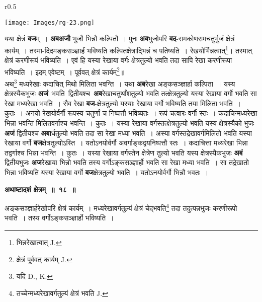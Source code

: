 \documentclass[11pt, openany]{book}
\begin{document}
\newpage

\begin{wrapfigure}{r}{0.5\textwidth}
\vspace{-4mm}
\begin{center}
\texttt{[image: Images/rg-23.png]}
\end{center}
\vspace{-8mm}
\end{wrapfigure}

यथा क्षेत्रं \textbf{बज}म्~। \textbf{अबअजौ} भुजौ भिन्नौ कल्पितौ~। पुनः \textbf{अब}भुजोपरि \textbf{बद}-समकोणसमचतुर्भुजं क्षेत्रं कार्यम्~। तस्मा-दिदमङ्कसञ्ज्ञार्हं भविष्यति कल्पितक्षेत्राद्भिन्नं च पतिष्यति~। रेखयोर्भिन्नत्वात्\renewcommand{\thefootnote}{१}\footnote{भिन्नरेखात्वात् J.}\;। तस्मात् क्षेत्रं करणीरूपं भविष्यति~। एवं हि यस्या रेखाया वर्गः क्षेत्रतुल्यो भवति तदा सापि रेखा करणीरूपा भविष्यति~। इदम् एवेष्टम्~। पूर्ववत् क्षेत्रं कार्यम्\renewcommand{\thefootnote}{२}\footnote{क्षेत्रं पूर्ववत् कार्यम् {\en J.}}\;॥ \\

 अथ\renewcommand{\thefootnote}{३}\footnote{यदि {\en D., K.}} मध्यरेखाः कदाचित् मिथो मिलिता भवन्ति~। यथा \textbf{अब}रेखा  अङ्कसञ्ज्ञार्हा कल्पिता~। यस्य \,क्षेत्रस्यैकभुजः \textbf{अजं} \,भवति \,द्वितीयश्च \,\textbf{अब}रेखाचतुर्थांशतुल्यो भवति तत्क्षेत्रतुल्यो यस्या रेखाया वर्गो भवति सा रेखा मध्यरेखा भवति~। सैव रेखा \textbf{बज}-क्षेत्रतुल्यो यस्याः रेखाया वर्गो भविष्यति तया मिलिता भवति~। कुतः~। अनयो रेखयोर्वर्गौ रूपस्य चतुर्णां च निष्पत्तौ भविष्यतः~। रूपं चत्वारः वर्गौ स्तः~।  कदाचिन्मध्यरेखा भिन्ना भवन्ति मिलितवर्गाश्च भवन्ति~। कुतः~। यस्या रेखाया वर्गस्तत्क्षेत्रतुल्यो भवति यस्य क्षेत्रस्यैको भुजः \textbf{अजं} द्वितीयश्च \textbf{अबा}र्धतुल्यो भवति तदा सा रेखा मध्या भवति~। अस्या वर्गस्तद्रेखावर्गमिलितो भवति यस्या रेखाया वर्गो \textbf{बज}क्षेत्रतुल्योऽस्ति~। यतोऽनयोर्वर्गौ अवर्गाङ्कद्वयनिष्पत्तौ स्तः~। कदाचित्ता मध्यरेखा भिन्ना तद्वर्गाश्च भिन्ना भवन्ति~। कुतः~। यस्या रेखाया वर्गस्तेन क्षेत्रेण तुल्यो भवति यस्य क्षेत्रस्यैकभुजः \textbf{अबं} द्वितीयभुजः \textbf{अज}रेखाया भिन्नो भवति तस्य वर्गोऽङ्कसञ्ज्ञार्हो भवति सा रेखा मध्या भवति~। सा तद्रेखातो भिन्ना भविष्यति यस्या रेखाया वर्गो \textbf{बज}क्षेत्रतुल्यो भवति~। यतोऽनयोर्वर्गौ भिन्नौ भवतः~। 

\newpage
\begin{center}
\textbf{\large अथाष्टादशं क्षेत्रम्~॥~१८~॥}
\end{center}

{\ab अङ्कसञ्ज्ञार्हरेखोपरि क्षेत्रं कार्यम्~। मध्यरेखावर्गतुल्यं क्षेत्रं चेद्भवति\renewcommand{\thefootnote}{१}\footnote{तच्चेन्मध्यरेखावर्गतुल्यं क्षेत्रं भवति {\en J.}} तदा तदुत्पन्नभुजः करणीरूपो भवति~। तस्य वर्गोऽङ्कसञ्ज्ञार्हो भविष्यति~। }\\
\end{document}

